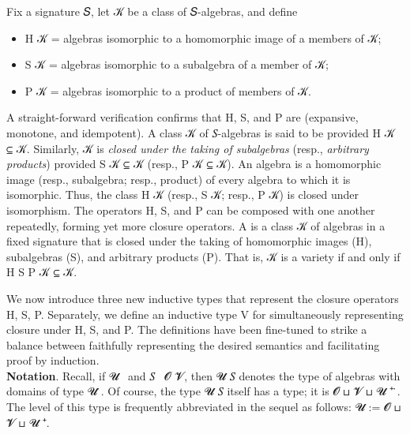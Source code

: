 \documentclass[a4paper,UKenglish,cleveref,autoref,thm-restate]{lipics-v2021}
\begin{document}
Fix a signature \ab 𝑆, let \ab 𝒦 be a class of \ab 𝑆-algebras, and define
\begin{itemize}
\item
  \af H \ab 𝒦 = algebras isomorphic to a homomorphic image of a members of \ab 𝒦;
\item
  \af S \ab 𝒦 = algebras isomorphic to a subalgebra of a member of \ab 𝒦;
\item
  \af P \ab 𝒦 = algebras isomorphic to a product of members of \ab 𝒦.
\end{itemize}
A straight-forward verification confirms that \af H, \af S, and \af P are  (expansive, monotone, and idempotent). A class \ab 𝒦 of \ab 𝑆-algebras is said to be  provided \af H \ab 𝒦 \aof ⊆ \ab 𝒦. Similarly, \ab 𝒦 is \emph{closed under the taking of subalgebras} (resp., \emph{arbitrary products}) provided \af S \ab 𝒦 \aof ⊆ \ab 𝒦 (resp., \af P \ab 𝒦 \aof ⊆ \ab 𝒦). An algebra is a homomorphic image (resp., subalgebra; resp., product) of every algebra to which it is isomorphic. Thus, the class \af H \ab 𝒦 (resp., \af S \ab 𝒦; resp., \af P \ab 𝒦) is closed under isomorphism. The operators \af H, \af S, and \af P can be composed with one another repeatedly, forming yet more closure operators. A  is a class \ab 𝒦 of algebras in a fixed signature that is closed under the taking of homomorphic images (\af H), subalgebras (\af S), and arbitrary products (\af P). That is, \ab 𝒦 is a variety if and only if
\af H \af S \af P \ab 𝒦 \aof ⊆ \ab 𝒦.

We now introduce three new inductive types that represent the closure operators \af H, \af S, \af P. Separately, we define an inductive type \af V for simultaneously representing closure under \af H, \af S, and \af P. The definitions have been fine-tuned to strike a balance between faithfully representing the desired semantics and facilitating proof by induction.\\[5pt]
\textbf{Notation}. Recall, if \ab 𝓤\AgdaSpace{}\as{:}~ and \ab 𝑆\AgdaSpace{}\as{:}~ \ab 𝓞 \ab 𝓥, then  \ab 𝓤 \ab 𝑆 denotes the type of algebras with domains of type \ab 𝓤 \af ̇.  Of course, the type  \ab 𝓤 \ab 𝑆 itself has a type; it is \ab 𝓞 \af ⊔ \ab 𝓥 \af ⊔ \ab 𝓤 \af ⁺ \af ̇.  The level of this type is frequently abbreviated in the sequel as follows: \AgdaSpace{}\ab 𝓤 := \ab 𝓞 \af ⊔ \ab 𝓥 \af ⊔ \ab 𝓤 \af ⁺.
\end{document}
